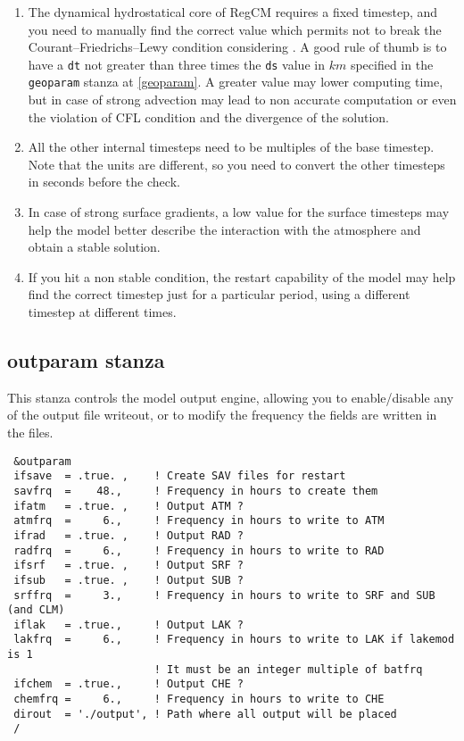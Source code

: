 \begin{enumerate}
\item The dynamical hydrostatical core of RegCM requires a fixed timestep,
and you need to manually find the correct value which permits not to break
the Courant–Friedrichs–Lewy condition considering \cite{CFL}. A good rule
of thumb is to have a \verb=dt= not greater than three times the \verb=ds=
value in $km$ specified in the \verb=geoparam= stanza at \ref{geoparam}.
A greater value may lower computing time, but in case of strong advection
may lead to non accurate computation or even the violation of CFL condition
and the divergence of the solution.
\item All the other internal timesteps need to be multiples of the base timestep.
Note that the units are different, so you need to convert the other timesteps
in seconds before the check.
\item In case of strong surface gradients, a low value for the surface timesteps
may help the model better describe the interaction with the atmosphere and
obtain a stable solution.
\item If you hit a non stable condition, the restart capability of the model
may help find the correct timestep just for a particular period, using a
different timestep at different times.
\end{enumerate}

\subsection{outparam stanza}

This stanza controls the model output engine, allowing you to enable/disable
any of the output file writeout, or to modify the frequency the fields are
written in the files.

{\footnotesize
\begin{Verbatim}
 &outparam
 ifsave  = .true. ,    ! Create SAV files for restart
 savfrq  =    48.,     ! Frequency in hours to create them
 ifatm   = .true. ,    ! Output ATM ?
 atmfrq  =     6.,     ! Frequency in hours to write to ATM
 ifrad   = .true. ,    ! Output RAD ?
 radfrq  =     6.,     ! Frequency in hours to write to RAD
 ifsrf   = .true. ,    ! Output SRF ?
 ifsub   = .true. ,    ! Output SUB ?
 srffrq  =     3.,     ! Frequency in hours to write to SRF and SUB (and CLM)
 iflak   = .true.,     ! Output LAK ?
 lakfrq  =     6.,     ! Frequency in hours to write to LAK if lakemod is 1
                       ! It must be an integer multiple of batfrq
 ifchem  = .true.,     ! Output CHE ?
 chemfrq =     6.,     ! Frequency in hours to write to CHE
 dirout  = './output', ! Path where all output will be placed
 /
\end{Verbatim}
}

